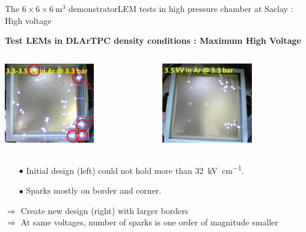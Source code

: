 \documentclass[10pt]{beamer}
\begin{document}
    \begin{frame}{The \texorpdfstring{$6 \times 6 \times \SI{6}{\meter\cubed}$}{666} demonstrator}{LEM tests in high pressure chamber at Saclay : High voltage}
    	\begin{scriptsize}
    		\begin{center}\textbf{Test LEMs in DLArTPC density conditions : Maximum High Voltage}\end{center}
    		\begin{columns}
	    		\begin{column}{0.48\textwidth}
	    			\centering \includegraphics[height=3.5cm]{figures/666/sparks_34.png}
	    		\end{column}\hfill
	    		\begin{column}{0.48\textwidth}
	    			\centering \includegraphics[height=3.5cm]{figures/666/sparks_35.png}
	    		\end{column}
	    	\end{columns}\vfill
	    	\begin{columns}
	    		\begin{column}{0.48\textwidth}
	    			\begin{itemize}
	    				\item[$\bullet$] Initial design (left) could not hold more than \SI{32}{\kilo\volt\per\centi\meter}.
	    				\item[$\bullet$] Sparks mostly on border and corner.
	    			\end{itemize}
	    			$\Rightarrow$ Create new design (right) with larger borders\\
	    			$\Rightarrow$ At same voltages, number of sparks is one order of magnitude smaller
	    		\end{column}\hfill
	    		\begin{column}{0.48\textwidth}

\end{column}
\end{columns}
\end{scriptsize}
\end{frame}
\end{document}
